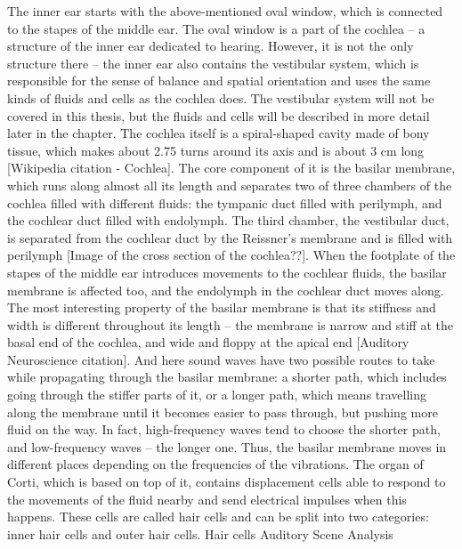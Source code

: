 The inner ear starts with the above-mentioned oval window, which is connected to the stapes of the middle ear. The oval window is a part of the cochlea – a structure of the inner ear dedicated to hearing. However, it is not the only structure there -- the inner ear also contains the vestibular system, which is responsible for the sense of balance and spatial orientation and uses the same kinds of fluids and cells as the cochlea does. The vestibular system will not be covered in this thesis, but the fluids and cells will be described in more detail later in the chapter.
The cochlea itself is a spiral-shaped cavity made of bony tissue, which makes about 2.75 turns around its axis and is about 3 cm long [Wikipedia citation - Cochlea]. The core component of it is the basilar membrane, which runs along almost all its length and separates two of three chambers of the cochlea filled with different fluids: the tympanic duct filled with perilymph, and the cochlear duct filled with endolymph. The third chamber, the vestibular duct, is separated from the cochlear duct by the Reissner’s membrane and is filled with perilymph [Image of the cross section of the cochlea??]. When the footplate of the stapes of the middle ear introduces movements to the cochlear fluids, the basilar membrane is affected too, and the endolymph in the cochlear duct moves along.
The most interesting property of the basilar membrane is that its stiffness and width is different throughout its length – the membrane is narrow and stiff at the basal end of the cochlea, and wide and floppy at the apical end [Auditory Neuroscience citation]. And here sound waves have two possible routes to take while propagating through the basilar membrane: a shorter path, which includes going through the stiffer parts of it, or a longer path, which means travelling along the membrane until it becomes easier to pass through, but pushing more fluid on the way. In fact, high-frequency waves tend to choose the shorter path, and low-frequency waves – the longer one.
Thus, the basilar membrane moves in different places depending on the frequencies of the vibrations. The organ of Corti, which is based on top of it, contains displacement cells able to respond to the movements of the fluid nearby and send electrical impulses when this happens. These cells are called hair cells and can be split into two categories: inner hair cells and outer hair cells.
Hair cells
Auditory Scene Analysis


